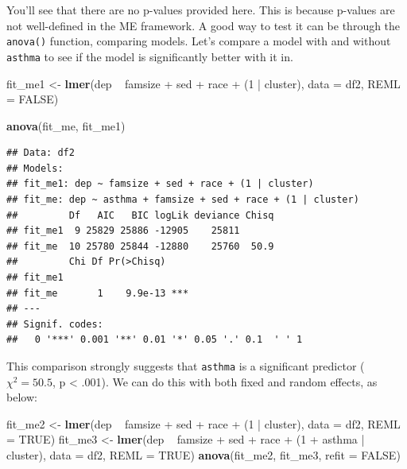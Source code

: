 \documentclass[]{tufte-book}
\newenvironment{Shaded}{}{}
\newcommand{\KeywordTok}[1]{\textcolor[rgb]{0.00,0.44,0.13}{\textbf{#1}}}
\newcommand{\DataTypeTok}[1]{\textcolor[rgb]{0.56,0.13,0.00}{#1}}
\newcommand{\DecValTok}[1]{\textcolor[rgb]{0.25,0.63,0.44}{#1}}
\newcommand{\StringTok}[1]{\textcolor[rgb]{0.25,0.44,0.63}{#1}}
\newcommand{\OtherTok}[1]{\textcolor[rgb]{0.00,0.44,0.13}{#1}}
\newcommand{\OperatorTok}[1]{\textcolor[rgb]{0.40,0.40,0.40}{#1}}
\newcommand{\NormalTok}[1]{#1}
\theoremstyle{definition}
\theoremstyle{definition}
\theoremstyle{remark}
\begin{document}
You'll see that there are no p-values provided here. This is because
p-values are not well-defined in the ME framework. A good way to test it
can be through the \texttt{anova()} function, comparing models. Let's
compare a model with and without \texttt{asthma} to see if the model is
significantly better with it in.

\begin{Shaded}
\begin{Highlighting}[]
\NormalTok{fit_me1 <-}\StringTok{ }\KeywordTok{lmer}\NormalTok{(dep }\OperatorTok{~}\StringTok{ }\NormalTok{famsize }\OperatorTok{+}\StringTok{ }\NormalTok{sed }\OperatorTok{+}\StringTok{ }\NormalTok{race }\OperatorTok{+}\StringTok{ }\NormalTok{(}\DecValTok{1} \OperatorTok{|}\StringTok{ }
\StringTok{    }\NormalTok{cluster), }\DataTypeTok{data =}\NormalTok{ df2, }\DataTypeTok{REML =} \OtherTok{FALSE}\NormalTok{)}

\KeywordTok{anova}\NormalTok{(fit_me, fit_me1)}
\end{Highlighting}
\end{Shaded}

\begin{verbatim}
## Data: df2
## Models:
## fit_me1: dep ~ famsize + sed + race + (1 | cluster)
## fit_me: dep ~ asthma + famsize + sed + race + (1 | cluster)
##         Df   AIC   BIC logLik deviance Chisq
## fit_me1  9 25829 25886 -12905    25811      
## fit_me  10 25780 25844 -12880    25760  50.9
##         Chi Df Pr(>Chisq)    
## fit_me1                      
## fit_me       1    9.9e-13 ***
## ---
## Signif. codes:  
##   0 '***' 0.001 '**' 0.01 '*' 0.05 '.' 0.1  ' ' 1
\end{verbatim}

This comparison strongly suggests that \texttt{asthma} is a significant
predictor (\(\chi^2 = 50.5\), p \textless{} .001). We can do this with
both fixed and random effects, as below:

\begin{Shaded}
\begin{Highlighting}[]
\NormalTok{fit_me2 <-}\StringTok{ }\KeywordTok{lmer}\NormalTok{(dep }\OperatorTok{~}\StringTok{ }\NormalTok{famsize }\OperatorTok{+}\StringTok{ }\NormalTok{sed }\OperatorTok{+}\StringTok{ }\NormalTok{race }\OperatorTok{+}\StringTok{ }\NormalTok{(}\DecValTok{1} \OperatorTok{|}\StringTok{ }
\StringTok{    }\NormalTok{cluster), }\DataTypeTok{data =}\NormalTok{ df2, }\DataTypeTok{REML =} \OtherTok{TRUE}\NormalTok{)}
\NormalTok{fit_me3 <-}\StringTok{ }\KeywordTok{lmer}\NormalTok{(dep }\OperatorTok{~}\StringTok{ }\NormalTok{famsize }\OperatorTok{+}\StringTok{ }\NormalTok{sed }\OperatorTok{+}\StringTok{ }\NormalTok{race }\OperatorTok{+}\StringTok{ }\NormalTok{(}\DecValTok{1} \OperatorTok{+}\StringTok{ }
\StringTok{    }\NormalTok{asthma }\OperatorTok{|}\StringTok{ }\NormalTok{cluster), }\DataTypeTok{data =}\NormalTok{ df2, }\DataTypeTok{REML =} \OtherTok{TRUE}\NormalTok{)}
\KeywordTok{anova}\NormalTok{(fit_me2, fit_me3, }\DataTypeTok{refit =} \OtherTok{FALSE}\NormalTok{)}
\end{Highlighting}
\end{Shaded}
\end{document}
